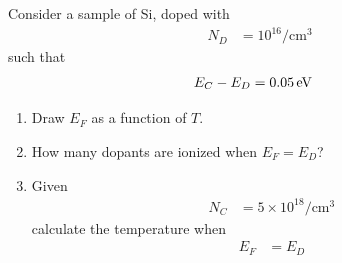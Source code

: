 \documentclass[titlepage, fleqn, a4paper, 12pt, twoside]{article}
\theoremstyle{definition}
\theoremstyle{theorem}
\begin{document}
\begin{question}
	Consider a sample of Si, doped with
	\begin{align*}
		N_D & = 10^{16} \si{\per\centi\metre\cubed}
	\end{align*}
	such that
	\begin{align*}
		E_C - E_D & = 0.05 \electronvolt
	\end{align*}
	\begin{enumerate}
		\item
			Draw $E_F$ as a function of $T$.
		\item
			How many dopants are ionized when $E_F = E_D$?
		\item
			Given
			\begin{align*}
				N_C & = 5 \times 10^{18} \si{\per\centi\metre\cubed}
			\end{align*}
			calculate the temperature when
			\begin{align*}
				E_F & = E_D
			\end{align*}
	\end{enumerate}
\end{question}
\end{document}
